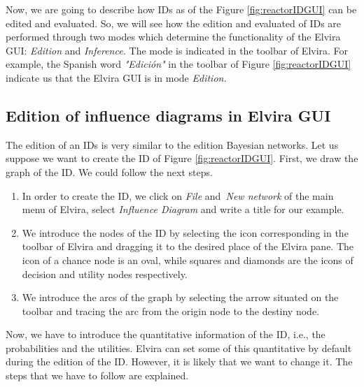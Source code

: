 Now, we are going to describe how IDs as of the Figure \ref{fig:reactorIDGUI}
can be edited and evaluated. So, we will see how the edition and evaluated
of IDs are performed through two modes which determine the functionality of
the Elvira GUI: \textit{Edition }and \textit{Inference.} The mode is
indicated in the toolbar of Elvira. For example, the Spanish word \textit{%
"Edici\'{o}n"} in the toolbar of Figure \ref{fig:reactorIDGUI} indicate us
that the Elvira GUI is in mode \textit{Edition.}

\subsection{Edition of influence diagrams in Elvira GUI}

The edition of an IDs is very similar to the edition Bayesian networks. Let
us suppose we want to create the ID of Figure \ref{fig:reactorIDGUI}. First,
we draw the graph of the ID. We could follow the next steps.

\begin{enumerate}
\item In order to create the ID, we click on \textit{File }and\textit{\ New
network }of the main menu of Elvira, select \textit{Influence Diagram} and
write a title for our example.

\item We introduce the nodes of the ID by selecting the icon corresponding
in the toolbar of Elvira and dragging it to the desired place of the Elvira
pane. The icon of a chance node is an oval, while squares and diamonds are
the icons of decision and utility nodes respectively.

\item We introduce the arcs of the graph by selecting the arrow situated on
the toolbar and tracing the arc from the origin node to the destiny node.
\end{enumerate}

Now, we have to introduce the quantitative information of the ID, i.e., the
probabilities and the utilities. Elvira can set some of this quantitative by
default during the edition of the ID. However, it is likely that we want to
change it. The steps that we have to follow are explained.

